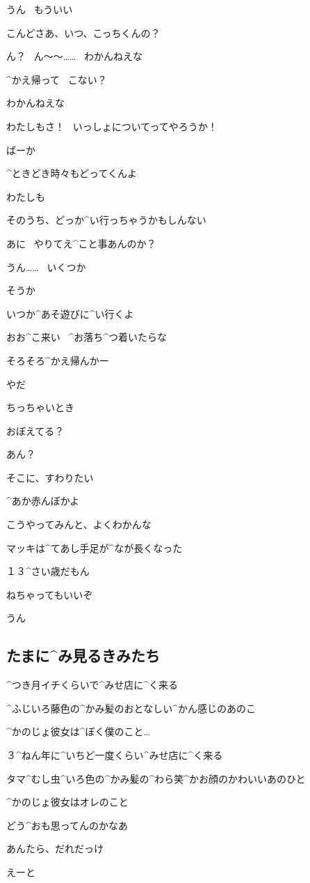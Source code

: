 \Makki うん
\ もういい

\Makki こんどさあ、いつ、こっちくんの？

\Takahiro ん？
\ ん〜〜……
\ わかんねえな

\page
\Makki ^{かえ}{帰}って
\ こない？

\Takahiro わかんねえな

\Makki わたしもさ！
\ いっしょについてってやろうか！

\Takahiro ばーか

\Takahiro ^{ときどき}{時々}もどってくんよ

\page
\Makki わたしも

\Makki そのうち、どっか^{い}{行}っちゃうかもしんない

\Takahiro あに
\ やりてえ^{こと}{事}あんのか？

\Makki うん……
\ いくつか

\Takahiro そうか

\Makki いつか^{あそ}{遊}びに^{い}{行}くよ

\Takahiro おお^{こ}{来}い
\ ^{お}{落}ち^{つ}{着}いたらな

\page
\Takahiro そろそろ^{かえ}{帰}んかー

\Makki やだ

\page
\Makki ちっちゃいとき

\Makki おぼえてる？

\Takahiro あん？

\Makki そこに、すわりたい

\Takahiro ^{あか}{赤}んぼかよ

\page
\Takahiro こうやってみんと、よくわかんな

\Takahiro マッキは^{てあし}{手足}が^{なが}{長}くなった

\Makki １３^{さい}{歳}だもん

\page
\Takahiro ねちゃってもいいぞ

\Makki うん


\subsection{たまに^{み}{見}るきみたち}
\Person ^{つき}{月}イチくらいで^{みせ}{店}に^{く}{来}る

\Person ^{ふじいろ}{藤色}の^{かみ}{髪}のおとなしい^{かん}{感}じのあのこ

\Person ^{かのじょ}{彼女}は^{ぼく}{僕}のこと…

\Person ３^{ねん}{年}に^{いちど}{一度}くらい^{みせ}{店}に^{く}{来}る

\Person タマ^{むし}{虫}^{いろ}{色}の^{かみ}{髪}の^{わら}{笑}^{かお}{顔}のかわいいあのひと

\Person ^{かのじょ}{彼女}はオレのこと

\Person どう^{おも}{思}ってんのかなあ

\Shiba あんたら、だれだっけ

\Shiba えーと
